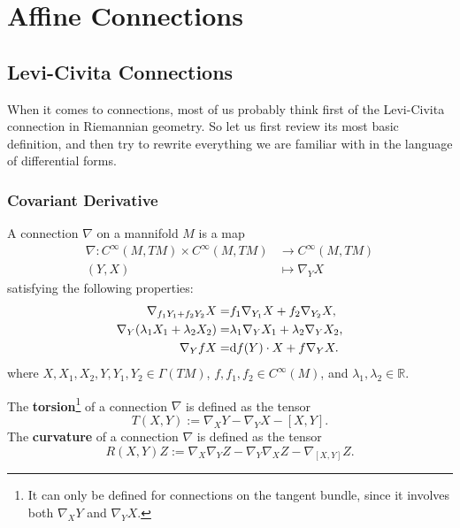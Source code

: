 \section{Affine Connections}

\subsection{Levi-Civita Connections}
When it comes to connections, most of us probably think first of 
the Levi-Civita connection in Riemannian geometry. 
So let us first review its most basic definition, 
and then try to rewrite everything we are familiar with in the language of differential forms.
\subsubsection{Covariant Derivative}
\begin{definition}
    A connection $\nabla$ on a mannifold $M$ is a map
    \begin{align*}
        \nabla: C^\infty(M,TM) \times C^\infty(M,TM) &\to C^\infty(M,TM) \\
        (Y,X) &\mapsto \nabla_Y X
    \end{align*}
    satisfying the following properties:
    \begin{align*}
        \nabla_{f_1Y_1 + f_2Y_2} X =& f_1 \nabla_{Y_1} X + f_2 \nabla_{Y_2} X, \\
        \nabla_{Y} (\lambda_1X_1 + \lambda_2 X_2) =& \lambda_1 \nabla_{Y} X_1 + \lambda_2 \nabla_{Y} X_2, \\
        \nabla_{Y} fX =& {\rm d} f(Y)\cdot X + f \nabla_{Y} X. 
    \end{align*}
    where $X,X_1,X_2,Y,Y_1,Y_2 \in \Gamma(TM)$, $f,f_1,f_2 \in C^\infty(M)$, 
    and $\lambda_1,\lambda_2 \in \mathbb{R}$.
\end{definition}

\begin{definition}
    The \textbf{torsion}\footnote{It can only be defined for connections on the tangent bundle, 
    since it involves both $\nabla_X Y$ and $\nabla_Y X$.} 
    of a connection $\nabla$ is defined as the tensor
    \begin{equation*}
        T(X,Y) := \nabla_X Y - \nabla_Y X - [X,Y].
    \end{equation*}
    The \textbf{curvature} of a connection $\nabla$ is defined as the tensor
    \begin{equation*}
        R(X,Y)Z := \nabla_X \nabla_Y Z - \nabla_Y \nabla_X Z - \nabla_{[X,Y]} Z.
    \end{equation*}
\end{definition}

